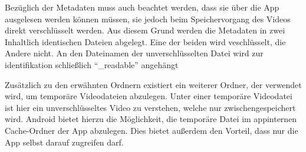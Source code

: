 Bezüglich der Metadaten muss auch beachtet werden, dass sie über die App ausgelesen werden können müssen, sie jedoch beim Speichervorgang des Videos direkt verschlüsselt werden. Aus diesem Grund werden die Metadaten in zwei Inhaltlich identischen Dateien abgelegt. Eine der beiden wird veschlüsselt, die Andere nicht. An den Dateinamen der unverschlüsselten Datei wird zur identifikation schließlich ``\_readable'' angehängt\newline\par

Zusätzlich zu den erwähnten Ordnern existiert ein weiterer Ordner, der verwendet wird, um temporäre Videodateien abzulegen. Unter einer temporäre Videodatei ist hier ein unverschlüsseltes Video zu verstehen, welche nur zwischengespeichert wird. Android bietet hierzu die Möglichkeit, die temporäre Datei im appinternen Cache-Ordner der App abzulegen. 
Dies bietet außerdem den Vorteil, dass nur die App selbst darauf zugreifen darf.

